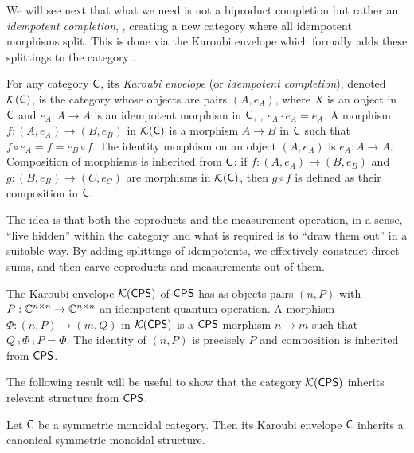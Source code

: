 We will see next that what we need is not a biproduct completion but rather an \emph{idempotent completion}, \ie, creating a new category where all idempotent morphisms split. This is done via the Karoubi envelope which formally adds these splittings to the category \cite{borceuxHandbookCategoricalAlgebra1994}.

\begin{definition}
  For any category $\mathsf{C}$, its \emph{Karoubi envelope} (or \emph{idempotent completion}), denoted $\mathcal{K}(\mathsf{C})$, is the category whose objects
 are pairs $(A, e_A)$, where $X$ is an object in $\mathsf{C}$ and $e_A \colon A \to A$ is an idempotent morphism in $\mathsf{C}$, \ie, $e_A \cdot e_A = e_A$.
A morphism $f \colon (A, e_A) \to (B, e_B)$ in $\mathcal{K}(\mathsf{C})$ is a morphism $ A \to B$ in $\mathsf{C}$ such that $f \circ e_A = f = e_B \circ f$.
The identity morphism on an object $(A, e_A)$ is $e_A \colon A \to A$. Composition of morphisms is inherited from $\mathsf{C}$: if $f \colon (A, e_A) \to (B, e_B)$ and $g \colon (B, e_B) \to (C, e_C)$ are morphisms in $\mathcal{K}(\mathsf{C})$, then $g \circ f$ is defined as their composition in $\mathsf{C}$.
\end{definition}
The idea is that both the coproducts and the measurement operation, in a sense, ``live hidden'' within the category and what is required is to ``draw them out'' in a suitable way. By adding splittings of idempotents, we effectively construct direct sums,  and then carve coproducts and measurements out of them.
\begin{definition}
        The Karoubi envelope $\mathcal{K}{(\mathsf{CPS})}$ of $\mathsf{CPS}$ has as objects pairs $(n,
        P)$ with $P : \mathbb{C}^{n \times n} \to \mathbb{C}^{n \times n}$ an
        idempotent quantum operation. A morphism $\Phi : (n,
        P) \to (m,Q)$ in $\mathcal{K}{(\mathsf{CPS})}$ is a $\mathsf{CPS}$-morphism $n \to m$  such that
        $Q \comp \Phi \comp P = \Phi$. The identity of $(n ,P)$ is precisely
        $P$ and composition is inherited from $\mathsf{CPS}$.
\end{definition}




The following result will be useful to show that the category $\mathcal{K}{(\mathsf{CPS})}$ inherits relevant structure from $\mathsf{CPS}$. 

\begin{proposition} \cite[Proposition 6.5.9]{borceuxHandbookCategoricalAlgebra1994a} \label{prop:kar_monoidal}
  Let $\mathsf{C}$ be a symmetric monoidal category. Then its Karoubi envelope $\mathsf{C}$ inherits a canonical symmetric monoidal structure.
\end{proposition}

